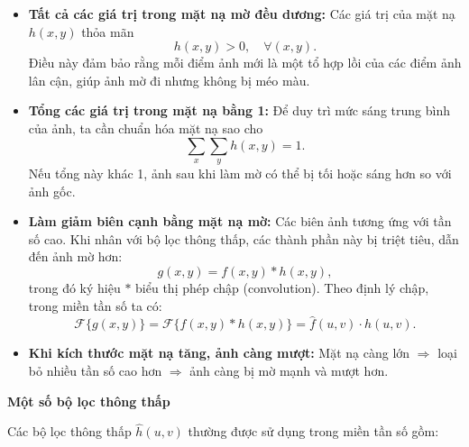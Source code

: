 \documentclass[12pt,a4paper]{report}
\numberwithin{equation}{section}
\theoremstyle{definition} %
\begin{document}
\begin{itemize}
	\item \textbf{Tất cả các giá trị trong mặt nạ mờ đều dương:}  
	Các giá trị của mặt nạ $h(x,y)$ thỏa mãn 
	\[
	h(x,y) > 0, \quad \forall (x,y).
	\]
	Điều này đảm bảo rằng mỗi điểm ảnh mới là một tổ hợp lồi của các điểm ảnh lân cận, giúp ảnh mờ đi nhưng không bị méo màu.

	\item \textbf{Tổng các giá trị trong mặt nạ bằng 1:}  
	Để duy trì mức sáng trung bình của ảnh, ta cần chuẩn hóa mặt nạ sao cho
	\[
	\sum_{x}\sum_{y} h(x,y) = 1.
	\]
	Nếu tổng này khác 1, ảnh sau khi làm mờ có thể bị tối hoặc sáng hơn so với ảnh gốc.

	\item \textbf{Làm giảm biên cạnh bằng mặt nạ mờ:}  
	Các biên ảnh tương ứng với tần số cao. Khi nhân với bộ lọc thông thấp, các thành phần này bị triệt tiêu, dẫn đến ảnh mờ hơn:
	\[
	g(x,y) = f(x,y) * h(x,y),
	\]
	trong đó ký hiệu $*$ biểu thị phép chập (convolution). Theo định lý chập, trong miền tần số ta có:
	\[
	\mathcal{F}\{g(x,y)\} = \mathcal{F}\{f(x,y)*h(x,y)\} = \hat{f}(u,v)\cdot\hat{h}(u,v).
	\]

	\item \textbf{Khi kích thước mặt nạ tăng, ảnh càng mượt:}  
	Mặt nạ càng lớn $\Rightarrow$ loại bỏ nhiều tần số cao hơn $\Rightarrow$ ảnh càng bị mờ mạnh và mượt hơn.
\end{itemize}

\begin{center}
\textbf{Một số bộ lọc thông thấp}
\end{center}
Các bộ lọc thông thấp $\hat{h}(u,v)$ thường được sử dụng trong miền tần số gồm:
\end{document}
